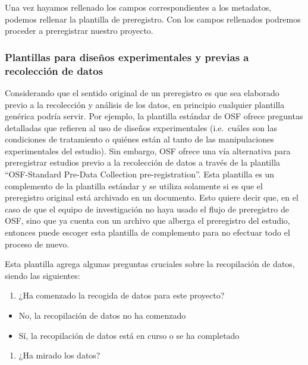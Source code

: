 \documentclass[
  spanish,
  letterpaper,
  DIV=11,
  numbers=noendperiod]{scrreprt}
\providecommand{\tightlist}{%
  \setlength{\itemsep}{0pt}\setlength{\parskip}{0pt}}
\begin{document}
Una vez hayamos rellenado los campos correspondientes a los metadatos,
podemos rellenar la plantilla de preregistro. Con los campos rellenados
podremos proceder a preregistrar nuestro proyecto.

\subsubsection{Plantillas para diseños experimentales y previas a
recolección de
datos}\label{plantillas-para-diseuxf1os-experimentales-y-previas-a-recolecciuxf3n-de-datos}

Considerando que el sentido original de un preregistro es que sea
elaborado previo a la recolección y análisis de los datos, en principio
cualquier plantilla genérica podría servir. Por ejemplo, la plantilla
estándar de OSF ofrece preguntas detalladas que refieren al uso de
diseños experimentales (i.e.~cuáles son las condiciones de tratamiento o
quiénes están al tanto de las manipulaciones experimentales del
estudio). Sin embargo, OSF ofrece una vía alternativa para preregistrar
estudios previo a la recolección de datos a través de la plantilla
``OSF-Standard Pre-Data Collection pre-registration''. Esta plantilla es
un complemento de la plantilla estándar y se utiliza solamente si es que
el preregistro original está archivado en un documento. Esto quiere
decir que, en el caso de que el equipo de investigación no haya usado el
flujo de preregistro de OSF, sino que ya cuenta con un archivo que
alberga el preregistro del estudio, entonces puede escoger esta
plantilla de complemento para no efectuar todo el proceso de nuevo.

Esta plantilla agrega algunas preguntas cruciales sobre la recopilación
de datos, siendo las siguientes:

\begin{enumerate}
\def\labelenumi{\arabic{enumi}.}
\tightlist
\item
  ¿Ha comenzado la recogida de datos para este proyecto?
\end{enumerate}

\begin{itemize}
\tightlist
\item
  No, la recopilación de datos no ha comenzado
\item
  Sí, la recopilación de datos está en curso o se ha completado
\end{itemize}

\begin{enumerate}
\def\labelenumi{\arabic{enumi}.}
\setcounter{enumi}{1}
\tightlist
\item
  ¿Ha mirado los datos?
\end{enumerate}
\end{document}
